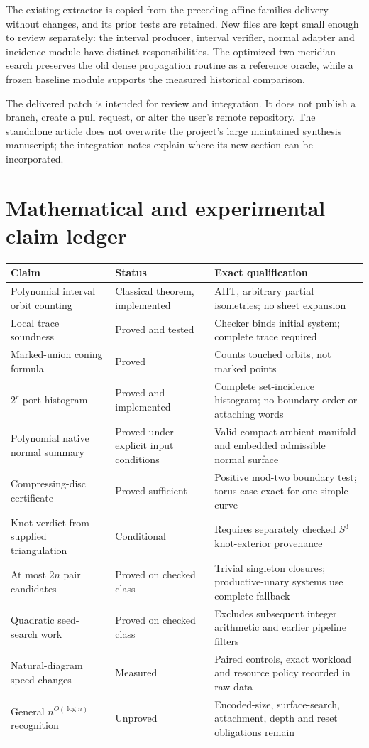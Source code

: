 \documentclass[11pt,a4paper]{article}
\theoremstyle{definition}\newtheorem{definition}[theorem]{Definition}
\theoremstyle{remark}\newtheorem{remark}[theorem]{Remark}
\newcommand{\qp}{n^{O(\log n)}}
\begin{document}
The existing extractor is copied from the preceding affine-families
delivery without changes, and its prior tests are retained. New files are
kept small enough to review separately: the interval producer, interval
verifier, normal adapter and incidence module have distinct responsibilities.
The optimized two-meridian search preserves the old dense propagation
routine as a reference oracle, while a frozen baseline module supports
the measured historical comparison.

The delivered patch is intended for review and integration. It does not
publish a branch, create a pull request, or alter the user's remote
repository. The standalone article does not overwrite the project's large
maintained synthesis manuscript; the integration notes explain where its
new section can be incorporated.

\appendix
\section{Mathematical and experimental claim ledger}

\begin{longtable}{@{}p{}p{}p{}@{}}
\toprule Claim & Status & Exact qualification\\\midrule\endhead
Polynomial interval orbit counting & Classical theorem, implemented &
AHT, arbitrary partial isometries; no sheet expansion\\
Local trace soundness & Proved and tested &
Checker binds initial system; complete trace required\\
Marked-union coning formula & Proved &
Counts touched orbits, not marked points\\
$2^r$ port histogram & Proved and implemented &
Complete set-incidence histogram; no boundary order or attaching words\\
Polynomial native normal summary & Proved under explicit input conditions &
Valid compact ambient manifold and embedded admissible normal surface\\
Compressing-disc certificate & Proved sufficient &
Positive mod-two boundary test; torus case exact for one simple curve\\
Knot verdict from supplied triangulation & Conditional &
Requires separately checked $S^3$ knot-exterior provenance\\
At most $2n$ pair candidates & Proved on checked class &
Trivial singleton closures; productive-unary systems use complete fallback\\
Quadratic seed-search work & Proved on checked class &
Excludes subsequent integer arithmetic and earlier pipeline filters\\
Natural-diagram speed changes & Measured &
Paired controls, exact workload and resource policy recorded in raw data\\
General $\qp$ recognition & Unproved &
Encoded-size, surface-search, attachment, depth and reset obligations remain\\
\bottomrule
\end{longtable}
\end{document}

